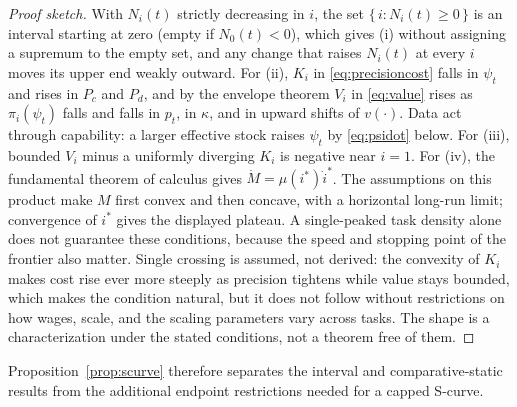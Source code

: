 \documentclass[12pt]{article}
\theoremstyle{plain}
\theoremstyle{definition}
\theoremstyle{remark}
\begin{document}
\begin{proof}[Proof sketch]
With $N_i(t)$ strictly decreasing in $i$, the set
$\{\,i : N_i(t) \ge 0\,\}$ is an interval starting at zero (empty if
$N_0(t) < 0$), which gives (i) without assigning a supremum to the empty
set, and any change that raises $N_i(t)$ at
every $i$ moves its upper end weakly outward. For (ii), $K_i$ in
\eqref{eq:precisioncost} falls in $\psi_t$ and rises in $P_c$ and $P_d$,
and by the envelope theorem $V_i$ in \eqref{eq:value} rises as
$\pi_i(\psi_t)$ falls and falls in $p_t$, in $\kappa$, and in upward
shifts of $v(\cdot)$. Data act through capability: a larger effective
stock raises $\psi_t$ by \eqref{eq:psidot} below. For (iii), bounded
$V_i$ minus a uniformly diverging $K_i$ is negative near $i=1$. For
(iv), the fundamental theorem of calculus gives
$\dot M=\mu(i^*)\dot i^*$. The assumptions on this product make $M$
first convex and then concave, with a horizontal long-run limit;
convergence of $i^*$ gives the displayed plateau. A single-peaked task
density alone does not guarantee these conditions, because the speed
and stopping point of the frontier also matter. Single crossing is assumed, not
derived: the convexity of $K_i$ makes cost rise ever more steeply as
precision tightens while value stays bounded, which makes the condition
natural, but it does not follow without restrictions on how wages,
scale, and the scaling parameters vary across tasks. The shape is a
characterization under the stated conditions, not a theorem free of them.
\end{proof}

Proposition~\ref{prop:scurve} therefore separates the interval and
comparative-static results from the additional endpoint restrictions
needed for a capped S-curve.
\end{document}
